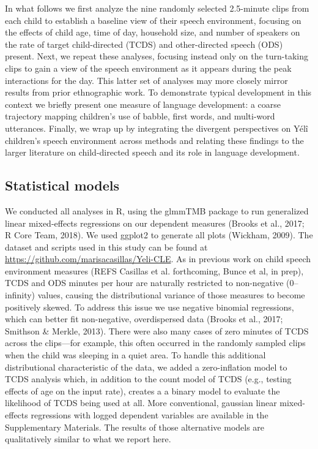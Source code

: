 \documentclass[,man,floatsintext]{apa6}
\begin{document}
In what follows we first analyze the nine randomly selected 2.5-minute
clips from each child to establish a baseline view of their speech
environment, focusing on the effects of child age, time of day,
household size, and number of speakers on the rate of target
child-directed (TCDS) and other-directed speech (ODS) present. Next, we
repeat these analyses, focusing instead only on the turn-taking clips to
gain a view of the speech environment as it appears during the peak
interactions for the day. This latter set of analyses may more closely
mirror results from prior ethnographic work. To demonstrate typical
development in this context we briefly present one measure of language
development: a coarse trajectory mapping children's use of babble, first
words, and multi-word utterances. Finally, we wrap up by integrating the
divergent perspectives on Yélî children's speech environment across
methods and relating these findings to the larger literature on
child-directed speech and its role in language development.

\subsection{Statistical models}\label{statistical-models}

We conducted all analyses in R, using the glmmTMB package to run
generalized linear mixed-effects regressions on our dependent measures
(Brooks et al., 2017; R Core Team, 2018). We used ggplot2 to generate
all plots (Wickham, 2009). The dataset and scripts used in this study
can be found at \url{https://github.com/marisacasillas/Yeli-CLE}. As in
previous work on child speech environment measures (REFS Casillas et al.
forthcoming, Bunce et al, in prep), TCDS and ODS minutes per hour are
naturally restricted to non-negative (0--infinity) values, causing the
distributional variance of those measures to become positively skewed.
To address this issue we use negative binomial regressions, which can
better fit non-negative, overdispersed data (Brooks et al., 2017;
Smithson \& Merkle, 2013). There were also many cases of zero minutes of
TCDS across the clips---for example, this often occurred in the randomly
sampled clips when the child was sleeping in a quiet area. To handle
this additional distributional characteristic of the data, we added a
zero-inflation model to TCDS analysis which, in addition to the count
model of TCDS (e.g., testing effects of age on the input rate), creates
a a binary model to evaluate the likelihood of TCDS being used at all.
More conventional, gaussian linear mixed-effects regressions with logged
dependent variables are available in the Supplementary Materials. The
results of those alternative models are qualitatively similar to what we
report here.
\end{document}
